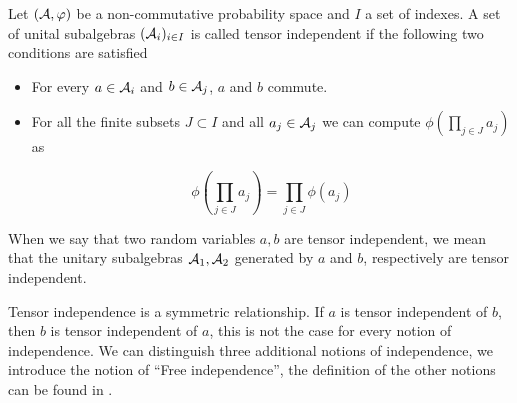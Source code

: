     \begin{definition}
        Let $(\mathcal A, \varphi)$ be a non-commutative probability space and $I$ a set of indexes. A set of unital subalgebras $(\mathcal A_{i})_{i\in I}$ is called tensor independent if the following two conditions are satisfied

        \begin{itemize}
            \item For every $a\in \mathcal A_i$ and $b\in \mathcal A_j$, $a$ and $b$ commute.
            \item For all the finite subsets $J\subset I$ and all $a_j \in \mathcal A_j$ we can compute $\phi\left( \prod_{j\in J} a_j \right)$ as
            
            \begin{equation*}
                \phi\left( \prod_{j\in J} a_j \right) = \prod_{j\in J}  \phi\left( a_j \right)
            \end{equation*}
        \end{itemize}

        When we say that two random variables $a,b$ are tensor independent, we mean that the unitary subalgebras $\mathcal A_1, \mathcal A_2$ generated by $a$ and $b$, respectively are tensor independent.
    \end{definition}

    Tensor independence is a symmetric relationship. If $a$ is tensor independent of $b$, then $b$ is tensor independent of $a$, this is not the case for every notion of independence. We can distinguish three additional notions of independence, we introduce the notion of ``Free independence'', the definition of the other notions can be found in \cite{anaya2016cumulantes}.





